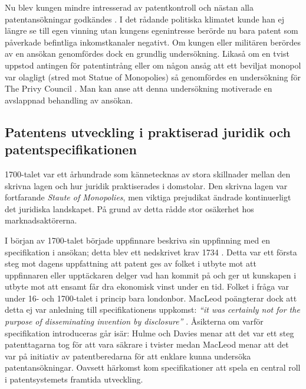 Nu blev kungen mindre intresserad av patentkontroll och nästan alla
patentansökningar godkändes \cite{bracha}. I det rådande politiska klimatet kunde han ej längre se till
egen vinning utan kungens egenintresse berörde nu bara patent som påverkade befintliga inkomstkanaler
negativt\cite{macleod2}. Om kungen eller militären berördes av en ansökan genomfördes dock en grundlig
undersökning. Likaså om en tvist uppstod antingen för patentintrång eller om någon ansåg att ett beviljat
monopol var olagligt (stred mot Statue of Monopolies) så genomfördes en undersökning för The Privy
Council \cite{bracha}. Man kan anse att denna undersökning motiverade en avslappnad behandling av ansökan.

\subsection{Patentens utveckling i praktiserad juridik och patentspecifikationen}

1700-talet var ett århundrade som kännetecknas av stora skillnader mellan den skrivna lagen och hur juridik praktiserades i domstolar. Den skrivna lagen var fortfarande \emph{Staute of Monopolies}, men viktiga prejudikat ändrade kontinuerligt det juridiska landskapet. På grund av detta rådde stor osäkerhet hos marknadsaktörerna.

I början av 1700-talet började uppfinnare beskriva sin uppfinning med en specifikation i ansökan; detta blev ett nedskrivet krav 1734 \cite{macleod}. 
Detta var ett första steg mot dagens uppfattning att patent ges av folket i utbyte mot att uppfinnaren eller
upptäckaren delger vad han kommit på och ger ut kunskapen i utbyte mot att ensamt får dra ekonomisk vinst
under en tid. Folket i fråga var under 16- och 1700-talet i princip bara londonbor. MacLeod poängterar dock att detta ej var anledning till specifikationens uppkomst: \emph{``it was certainly not for the purpose of disseminating invention by disclosure''} \cite{macleod2}. Åsikterna om varför specifikation introduceras går isär: Hulme och Davies menar att det var ett steg patenttagarna tog för att vara säkrare i tvister medan MacLeod menar att det var på initiativ av patentberedarna för att enklare kunna undersöka patentansökningar. Oavsett härkomst kom specifikationer att spela en central roll i patentsystemets framtida utveckling.


